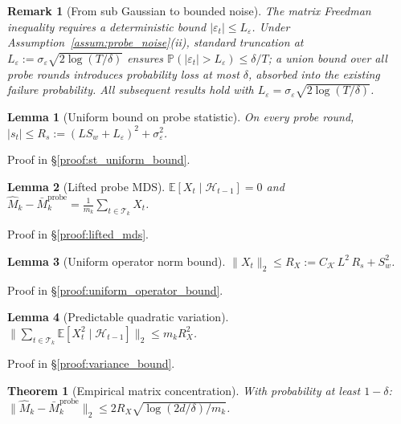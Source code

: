 \documentclass{article}
\newcommand{\E}{\mathbb{E}}
\newcommand{\Prob}{\mathbb{P}}
\newcommand{\cH}{\mathcal{H}}
\newcommand{\cT}{\mathcal{T}}
\newtheorem{lemma}{Lemma}
\newtheorem{theorem}{Theorem}
\newtheorem{remark}{Remark}
\begin{document}
\begin{remark}[From sub Gaussian to bounded noise]
    \label{rem:truncation}
    \label{assum:bounded_probe_noise}
    The matrix Freedman inequality requires a deterministic bound $|\varepsilon_t| \le L_\varepsilon$. Under
    Assumption~\ref{assum:probe_noise}(ii), standard truncation at $L_\varepsilon :=
  \sigma_\varepsilon\sqrt{2\log(T/\delta)}$ ensures
    $\Prob(|\varepsilon_t| > L_\varepsilon) \le \delta/T$; a union bound over all probe rounds introduces probability loss
  at most
    $\delta$, absorbed into the existing failure probability. All subsequent results hold with $L_\varepsilon =
    \sigma_\varepsilon\sqrt{2\log(T/\delta)}$.
\end{remark}

\begin{lemma}[Uniform bound on probe statistic]
\label{lem:st_uniform_bound}
On every probe round, $|s_t| \le R_s := (LS_w + L_\varepsilon)^2 + \sigma_\varepsilon^2$.
\end{lemma}

Proof in \S\ref{proof:st_uniform_bound}.

\begin{lemma}[Lifted probe MDS]
\label{lem:lifted_mds}
$\E[X_t \mid \cH_{t-1}] = 0$ and $\widehat{M}_k - \bar{M}_k^{\mathrm{probe}} = \frac{1}{m_k}\sum_{t \in \cT_k} X_t$.
\end{lemma}

Proof in \S\ref{proof:lifted_mds}.

\begin{lemma}[Uniform operator norm bound]
\label{lem:uniform_operator_bound}
$\|X_t\|_2 \le R_X := C_{\mathcal K}\,L^2\,R_s + S_w^2$.
\end{lemma}

Proof in \S\ref{proof:uniform_operator_bound}.

\begin{lemma}[Predictable quadratic variation]
\label{lem:variance_bound}
$\|\sum_{t \in \cT_k} \E[X_t^2 \mid \cH_{t-1}]\|_2 \le m_k R_X^2$.
\end{lemma}

Proof in \S\ref{proof:variance_bound}.

\begin{theorem}[Empirical matrix concentration]
\label{thm:matrix_concentration_summary}
With probability at least $1-\delta$:
$\|\widehat{M}_k - \bar{M}_k^{\mathrm{probe}}\|_2 \le 2R_X \sqrt{\log(2d/\delta)/m_k}$.
\end{theorem}
\end{document}
